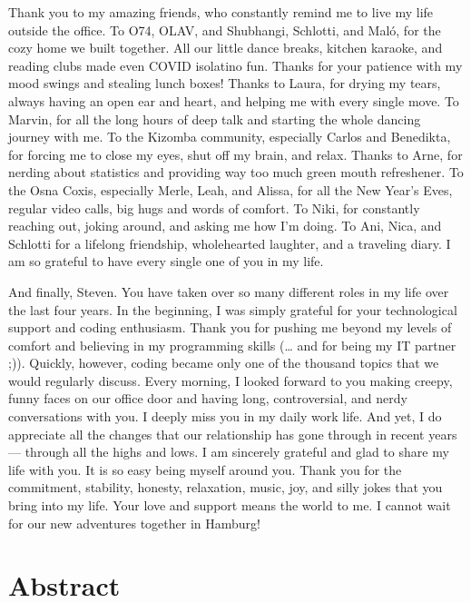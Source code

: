 \documentclass[
]{scrbook}
\begin{document}
Thank you to my amazing friends, who constantly remind me to live my life outside the office. To O74, OLAV, and Shubhangi, Schlotti, and Maló, for the cozy home we built together. All our little dance breaks, kitchen karaoke, and reading clubs made even COVID isolatino fun. Thanks for your patience with my mood swings and stealing lunch boxes! Thanks to Laura, for drying my tears, always having an open ear and heart, and helping me with every single move. To Marvin, for all the long hours of deep talk and starting the whole dancing journey with me. To the Kizomba community, especially Carlos and Benedikta, for forcing me to close my eyes, shut off my brain, and relax. Thanks to Arne, for nerding about statistics and providing way too much green mouth refreshener. To the Osna Coxis, especially Merle, Leah, and Alissa, for all the New Year's Eves, regular video calls, big hugs and words of comfort. To Niki, for constantly reaching out, joking around, and asking me how I'm doing. To Ani, Nica, and Schlotti for a lifelong friendship, wholehearted laughter, and a traveling diary. I am so grateful to have every single one of you in my life.

And finally, Steven. You have taken over so many different roles in my life over the last four years. In the beginning, I was simply grateful for your technological support and coding enthusiasm. Thank you for pushing me beyond my levels of comfort and believing in my programming skills (\ldots{} and for being my IT partner ;)). Quickly, however, coding became only one of the thousand topics that we would regularly discuss. Every morning, I looked forward to you making creepy, funny faces on our office door and having long, controversial, and nerdy conversations with you. I deeply miss you in my daily work life. And yet, I do appreciate all the changes that our relationship has gone through in recent years --- through all the highs and lows. I am sincerely grateful and glad to share my life with you. It is so easy being myself around you. Thank you for the commitment, stability, honesty, relaxation, music, joy, and silly jokes that you bring into my life. Your love and support means the world to me. I cannot wait for our new adventures together in Hamburg!

\chapter{Abstract}\label{abstract}
\end{document}
